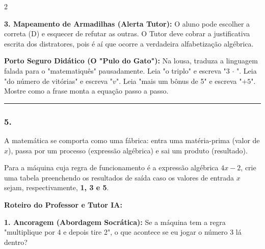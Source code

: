 \begin{multicols*}{2}
\begin{tcolorbox}[colback=CorTitUm!5, colframe=CorTitUm, boxrule=1pt, arc=4pt, left=6pt, right=6pt, top=6pt, bottom=6pt]
    \textbf{3. Mapeamento de Armadilhas (Alerta Tutor):} O aluno pode escolher a correta (D) e esquecer de refutar as outras. O Tutor deve cobrar a justificativa escrita dos distratores, pois é aí que ocorre a verdadeira alfabetização algébrica.
    \end{tcolorbox}
    \vspace{0.15cm}
    
    \begin{boxexplicacao}
    \textbf{Porto Seguro Didático (O "Pulo do Gato"):} Na lousa, traduza a linguagem falada para o "matematiquês" pausadamente. Leia "o triplo" e escreva "3 $\cdot$ ". Leia "do número de vitórias" e escreva "$v$". Leia "mais um bônus de 5" e escreva "$+ 5$". Mostre como a frase monta a equação passo a passo.
    \end{boxexplicacao}
\fi

\par\vspace{\espacoQuestao}

\noindent\textcolor{CorLinha}{\rule{\linewidth}{0.5pt}} 
\par\vspace{\espacoPreQuestao}
\subsubsection*{5.} 
\begin{enunciadoLiteral}
A matemática se comporta como uma fábrica: entra uma matéria-prima (valor de $x$), passa por um processo (expressão algébrica) e sai um produto (resultado). 

Para a máquina cuja regra de funcionamento é a expressão algébrica $ 4x - 2 $, crie uma tabela preenchendo os resultados de saída caso os valores de entrada $x$ sejam, respectivamente, \textbf{1, 3 e 5}.
\end{enunciadoLiteral}

\ifgabarito
    \begin{tcolorbox}[colback=CorTitUm!5, colframe=CorTitUm, boxrule=1pt, arc=4pt, left=6pt, right=6pt, top=6pt, bottom=6pt]
    \small\textbf{\textcolor{CorTitUm}{Roteiro do Professor e Tutor IA:}}\par\vspace{0.1cm}
    \color{CinzaEscuro}
    \textbf{1. Ancoragem (Abordagem Socrática):} Se a máquina tem a regra "multiplique por 4 e depois tire 2", o que acontece se eu jogar o número 3 lá dentro?\par\vspace{0.1cm}
    

\end{tcolorbox}
\end{multicols*}
